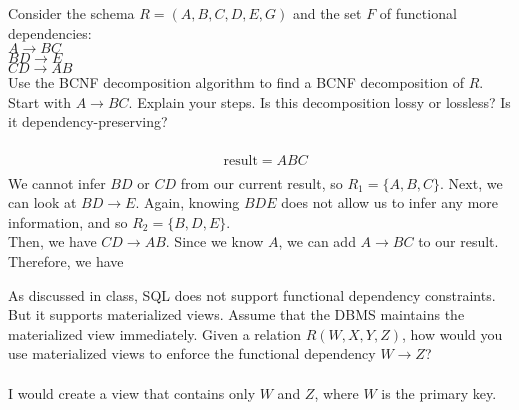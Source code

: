 \documentclass[a4 paper]{article}
\begin{document}
Consider the schema $R = (A, B, C, D, E, G)$ and the set $F$ of functional dependencies:\\
$A \rightarrow BC$\\
$BD \rightarrow E$\\
$CD \rightarrow AB$\\
Use the BCNF decomposition algorithm to find a BCNF decomposition of $R$. Start with $A \rightarrow BC$. Explain your steps. Is this decomposition lossy or lossless? Is it dependency-preserving?\\\\
\begin{align*}
  &\text{result} = ABC\\
\end{align*}
We cannot infer $BD$ or $CD$ from our current result, so $R_1=\{A,B,C\}$.
Next, we can look at $BD\rightarrow E$. Again, knowing $BDE$ does not allow us to infer any more information, and so $R_2=\{B,D,E\}$.\\
Then, we have $CD\rightarrow AB$. Since we know $A$, we can add $A\rightarrow BC$ to our result. Therefore, we have



As discussed in class, SQL does not support functional dependency constraints. But it supports materialized views. Assume that the DBMS maintains the materialized view immediately. Given a relation $R(W, X, Y, Z)$, how would you use materialized views to enforce the functional dependency $W \rightarrow Z$?\\\\
I would create a view that contains only $W$ and $Z$, where $W$ is the primary key.
\end{document}
